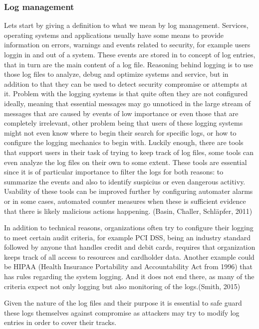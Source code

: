 \documentclass{article}
\begin{document}
\subsubsection{Log management}
Lets start by giving a definition to what we mean by log management. Services, operating systems and applications usually have some means to provide information on errors, warnings and events related to security, for example users loggin in and out of a system. These events are stored in to concept of log entries, that in turn are the main content of a log file. Reasoning behind logging is to use those log files to analyze, debug and optimize systems and service, but in addition to that they can be used to detect security compromise or attempts at it.
Problem with the logging systems is that quite often they are not configured ideally, meaning that essential messages may go unnoticed in the large stream of messages that are caused by events of low importance or even those that are completely irrelevant, other problem being that users of these logging systems might not even know where to begin their search for specific logs, or how to configure the logging mechanics to begin with. Luckily enough, there are tools that support users in their task of trying to keep track of log files, some tools can even analyze the log files on their own to some extent. These tools are essential since it is of particular importance to filter the logs for both reasons: to summarize the events and also to identify suspicius or even dangerous actitivy. Usability of these tools can be improved further by configuring automater alarms or in some cases, automated counter measures when these is sufficient evidence that there is likely malicious actions happening. (Basin, Challer, Schläpfer, 2011)
\par
In addition to technical reasons, organizations often try to configure their logging to meet certain audit criteria, for example PCI DSS, being an industry standard followed by anyone that handles credit and debit cards, requires that organization keeps track of all access to resources and cardholder data. Another example could be HIPAA (Health Insurance Portability and Accountability Act from 1996) that has rules regarding the system logging. And it does not end there, as many of the criteria expect not only logging but also monitoring of the logs.(Smith, 2015)
\par
Given the nature of the log files and their purpose it is essential to safe guard these logs themselves against compromise as attackers may try to modify log entries in order to cover their tracks.
\end{document}
